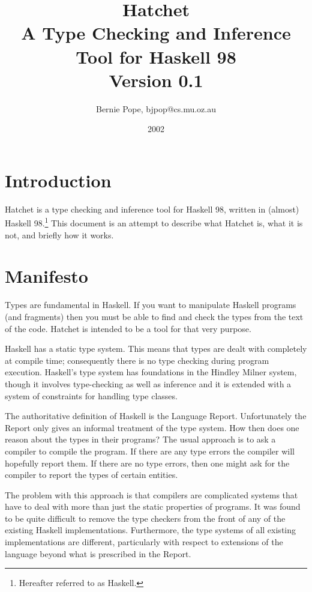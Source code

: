 \documentclass{article}
\begin{document}
\title{Hatchet \\ 
A Type Checking and Inference Tool for Haskell 98\\
Version 0.1}
\author{Bernie Pope, bjpop@cs.mu.oz.au}
\date{2002}

\maketitle

\section{Introduction}

Hatchet is a type checking and inference tool for 
Haskell 98, written in (almost) 
Haskell 98.\footnote{Hereafter referred to as Haskell.}
This document is an attempt to describe what Hatchet is, 
what it is not, and briefly how it works.

\section{Manifesto}

Types are fundamental in Haskell. If you want to manipulate
Haskell programs (and fragments) then you must be able to
find and check the types from the text of the code. Hatchet is
intended to be a tool for that very purpose.

Haskell has a static type system. This means that types 
are dealt with completely at compile time; consequently
there is no type checking during program execution. Haskell's
type system has foundations in the Hindley Milner system, 
though it involves type-checking as well as inference and it is
extended with a system of constraints for handling 
type classes. 

The authoritative definition of Haskell is the
Language Report. Unfortunately the Report only gives an
informal treatment of the type system. How then does one reason
about the types in their programs? The usual approach is to
ask a compiler to compile the program. If there are any type
errors the compiler will hopefully report them. If there
are no type errors, then one might ask for the compiler to
report the types of certain entities. 

The problem with this approach is that compilers are complicated systems 
that have to deal with more than just the static properties
of programs. It was found to be quite difficult to remove the
type checkers from the front of any of the existing Haskell
implementations. Furthermore, the type systems of all 
existing implementations are different, particularly with respect
to extensions of the language beyond what is prescribed in the
Report.
\end{document}
